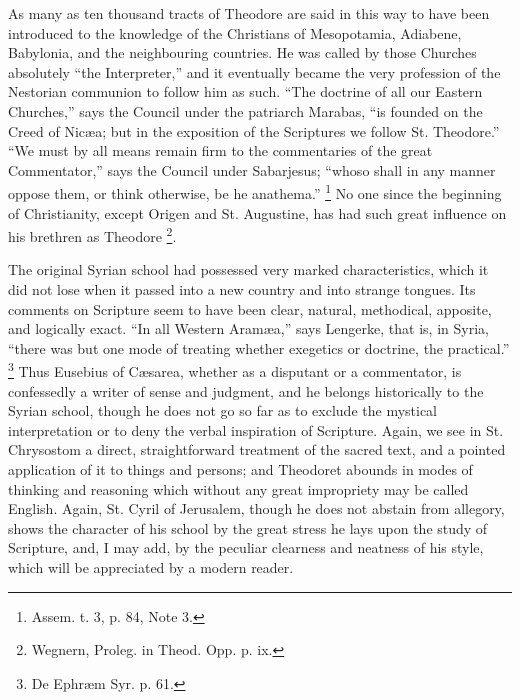 As many as ten thousand tracts of Theodore are said in this way to
have been introduced to the knowledge of the Christians of
Mesopotamia, Adiabene, Babylonia, and the neighbouring countries. He
was called by those Churches absolutely ``the Interpreter,''
and it eventually became the very profession of the Nestorian
communion to follow him as such. ``The doctrine of all our Eastern
Churches,'' says the Council under the patriarch Marabas, ``is
founded on the Creed of Nicæa; but in the exposition of the
Scriptures we follow St. Theodore.'' ``We must by all means
remain firm to the commentaries of the great Commentator,'' says
the Council under Sabarjesus; ``whoso shall in any manner oppose
them, or think otherwise, be he anathema.'' \footnote{Assem. t. 3, p. 84, Note 3.} No one since the beginning of Christianity, except Origen and
St. Augustine, has had such great influence on his brethren as
Theodore \footnote{Wegnern, Proleg. in Theod. Opp. p. ix.}.

The original Syrian school had possessed very marked
characteristics, which it did not lose when it passed into a new
country and into strange tongues. Its comments on Scripture seem to
have been clear, natural, methodical, apposite, and logically exact.
``In all Western Aramæa,'' says Lengerke, that is, in Syria,
``there was but one mode of treating whether exegetics or
doctrine, the practical.'' \footnote{De Ephræm Syr. p. 61.}
Thus Eusebius of Cæsarea, whether as a disputant or a commentator, is
confessedly a writer of sense and judgment, and he belongs
historically to the Syrian school, though he does not go so far as to
exclude the mystical interpretation or to deny the verbal inspiration
of Scripture. Again, we see in St. Chrysostom a direct,
straightforward treatment of the sacred text, and a pointed
application of it to things and persons; and Theodoret abounds in
modes of thinking and reasoning which without any great impropriety
may be called English. Again, St. Cyril of Jerusalem, though he does
not abstain from allegory, shows the character of his school by the
great stress he lays upon the study of Scripture, and, I may add, by
the peculiar clearness and neatness of his style, which will be
appreciated by a modern reader.

